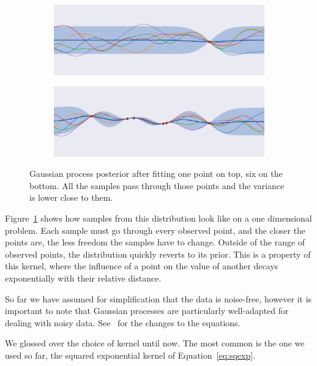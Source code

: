 \begin{figure}[htb]
    \centering
    \begin{subfigure}[b]{\textwidth}
        \includegraphics[width=\textwidth]{img_hyperopt/gp_posterior_1_point}
    \end{subfigure}

    \begin{subfigure}[b]{\textwidth}
        \includegraphics[width=\textwidth]{img_hyperopt/gp_posterior_6_point}
    \end{subfigure}
    \caption{Gaussian process posterior after fitting one point on top, six on the bottom. All the samples pass through those points and the variance is lower close to them.}
    \label{fig:gp_posterior}
\end{figure}

Figure~\ref{fig:gp_posterior} shows how samples from this distribution look like on a one dimensional problem. Each sample must go through every observed point, and the closer the points are, the less freedom the samples have to change. Outside of the range of observed points, the distribution quickly reverts to its prior. This is a property of this kernel, where the influence of a point on the value of another decays exponentially with their relative distance.

So far we have assumed for simplification that the data is noise-free, however it is important to note that Gaussian processes are particularly well-adapted for dealing with noisy data. See~\textcite{rasmussen2005} for the changes to the equations.

We glossed over the choice of kernel until now. The most common is the one we used so far, the squared exponential kernel of Equation~\ref{eq:sqexp}.


